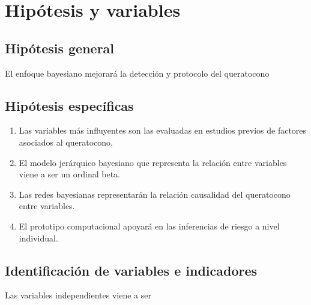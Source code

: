 \section{Hipótesis y variables}
\subsection{Hipótesis general}
El enfoque bayesiano mejorará la detección y protocolo del queratocono

\subsection{Hipótesis específicas}
\begin{enumerate}
    \item Las variables más influyentes son las evaluadas en estudios previos de factores asociados al queratocono.
    \item El modelo jerárquico bayesiano que representa la relación entre variables viene a ser un ordinal beta.
    \item Las redes bayesianas representarán la relación causalidad del queratocono entre variables.
    \item El prototipo computacional apoyará en las inferencias de riesgo a nivel individual.
\end{enumerate}

\subsection{Identificación de variables e indicadores}
Las variables independientes viene a ser 






